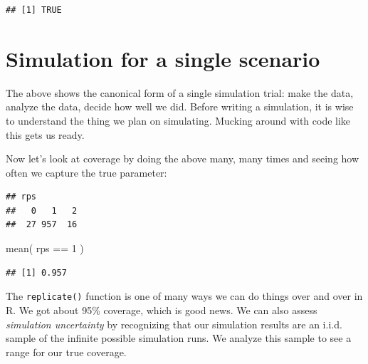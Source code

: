 \documentclass[
]{book}
\newenvironment{Shaded}{\begin{snugshade}}{\end{snugshade}}
\newcommand{\DecValTok}[1]{\textcolor[rgb]{0.00,0.00,0.81}{#1}}
\newcommand{\FunctionTok}[1]{\textcolor[rgb]{0.00,0.00,0.00}{#1}}
\newcommand{\NormalTok}[1]{#1}
\newcommand{\OtherTok}[1]{\textcolor[rgb]{0.56,0.35,0.01}{#1}}
\newcommand{\SpecialCharTok}[1]{\textcolor[rgb]{0.00,0.00,0.00}{#1}}
\begin{document}
\begin{verbatim}
## [1] TRUE
\end{verbatim}

\hypertarget{simulation-for-a-single-scenario}{%
\section{Simulation for a single scenario}\label{simulation-for-a-single-scenario}}

The above shows the canonical form of a single simulation trial: make the
data, analyze the data, decide how well we did.
Before writing a simulation, it is wise to understand the thing we plan on simulating.
Mucking around with code like this gets us ready.

Now let's look at coverage by doing the above many, many times and seeing how
often we capture the true parameter:

\begin{Shaded}
\end{Shaded}

\begin{verbatim}
## rps
##   0   1   2 
##  27 957  16
\end{verbatim}

\begin{Shaded}
\begin{Highlighting}[]
\FunctionTok{mean}\NormalTok{( rps }\SpecialCharTok{==} \DecValTok{1}\NormalTok{ )}
\end{Highlighting}
\end{Shaded}

\begin{verbatim}
## [1] 0.957
\end{verbatim}

The \texttt{replicate()} function is one of many ways we can do things over and over in R.
We got about 95\% coverage, which is good news. We can also assess
\emph{simulation uncertainty} by recognizing that our simulation results are an
i.i.d. sample of the infinite possible simulation runs. We analyze this
sample to see a range for our true coverage.
\end{document}
